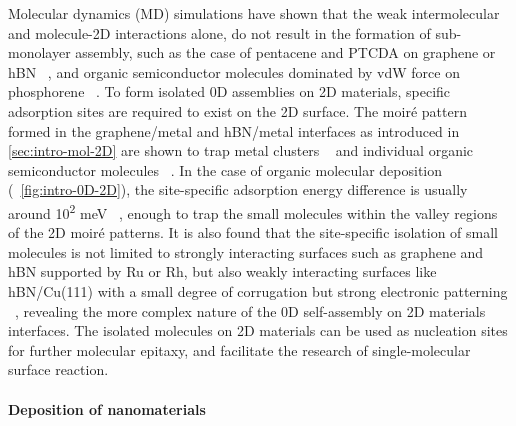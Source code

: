 Molecular dynamics (MD) simulations have shown that the weak
intermolecular and molecule-2D interactions alone, do not result in
the formation of sub-monolayer assembly, such as the case of pentacene
and PTCDA on graphene or hBN ~\autocite{Zhao_2015_self_assemb_gr_MD}, and
organic semiconductor molecules dominated by vdW force on phosphorene
~\autocite{Mukhopadhyay_2017_cryst_BP}.
% 
To form isolated 0D assemblies on 2D materials, specific adsorption sites are
required to exist on the 2D surface.
% 
The moiré pattern formed in the graphene/metal and hBN/metal
interfaces as introduced in \autoref{sec:intro-mol-2D} are shown to
trap metal clusters
~\autocite{Goriachko_2007_assembl_hBN_ru,Pan_2009_Pt_cluster_gr,Wang_2011_gr_hBN_metal_cl,Zhang_2014_metal_gr_Ru}
and individual organic semiconductor molecules
~\autocite{Joshi_2014_TCNQ_hBN,Dil_2008_hBN_Rh,Lu_2012_c60_gr_moire}.
%
In the case of organic molecular deposition
(~\autoref{fig:intro-0D-2D}), the site-specific adsorption energy
difference is usually around 10\textsuperscript{2} meV
~\autocite{Lu_2012_c60_gr_moire,Iannuzzi_2014_MPc_hBN_Rh}, enough to trap
the small molecules within the valley regions of the 2D moiré
patterns. It is also found that the site-specific
isolation of small molecules is not limited to strongly interacting
surfaces such as graphene and hBN supported by Ru or Rh, but also
weakly interacting surfaces like hBN/Cu(111) with a small degree of
corrugation but strong electronic patterning
~\autocite{Joshi_2012_hBN_Cu,Joshi_2014_TCNQ_hBN}, revealing the more
complex nature of the 0D self-assembly on 2D materials interfaces.
%
The isolated molecules on 2D materials can be used as nucleation sites
for further molecular epitaxy, and facilitate the research of
single-molecular surface reaction.


\paragraph{Deposition of nano\-materials}



